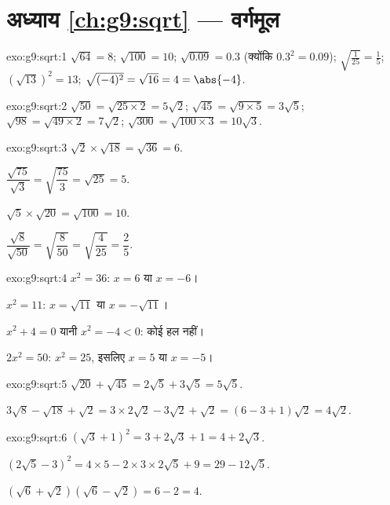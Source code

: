\section*{अध्याय \ref{ch:g9:sqrt} --- वर्गमूल}

\begin{solution}{exo:g9:sqrt:1}
$\sqrt{64} = 8$; \quad $\sqrt{100} = 10$; \quad
$\sqrt{0.09} = 0.3$ (क्योंकि $0.3^2 = 0.09$); \quad
$\sqrt{\frac{1}{25}} = \frac15$; \quad
$\left(\sqrt{13}\right)^2 = 13$; \quad
$\sqrt{(-4)^2} = \sqrt{16} = 4 = \abs{-4}$.
\end{solution}

\begin{solution}{exo:g9:sqrt:2}
$\sqrt{50} = \sqrt{25 \times 2} = 5\sqrt2$; \quad
$\sqrt{45} = \sqrt{9 \times 5} = 3\sqrt5$; \quad
$\sqrt{98} = \sqrt{49 \times 2} = 7\sqrt2$; \quad
$\sqrt{300} = \sqrt{100 \times 3} = 10\sqrt3$.
\end{solution}

\begin{solution}{exo:g9:sqrt:3}
$\sqrt2 \times \sqrt{18} = \sqrt{36} = 6$.

$\dfrac{\sqrt{75}}{\sqrt3} = \sqrt{\dfrac{75}{3}} = \sqrt{25} = 5$.

$\sqrt5 \times \sqrt{20} = \sqrt{100} = 10$.

$\dfrac{\sqrt8}{\sqrt{50}} = \sqrt{\dfrac{8}{50}} = \sqrt{\dfrac{4}{25}}
= \dfrac25$.
\end{solution}

\begin{solution}{exo:g9:sqrt:4}
$x^2 = 36$: $x = 6$ या $x = -6$।

$x^2 = 11$: $x = \sqrt{11}$ या $x = -\sqrt{11}$।

$x^2 + 4 = 0$ यानी $x^2 = -4 < 0$: कोई हल नहीं।

$2x^2 = 50$: $x^2 = 25$, इसलिए $x = 5$ या $x = -5$।
\end{solution}

\begin{solution}{exo:g9:sqrt:5}
$\sqrt{20} + \sqrt{45} = 2\sqrt5 + 3\sqrt5 = 5\sqrt5$.

$3\sqrt8 - \sqrt{18} + \sqrt2 = 3 \times 2\sqrt2 - 3\sqrt2 + \sqrt2
= (6 - 3 + 1)\sqrt2 = 4\sqrt2$.
\end{solution}

\begin{solution}{exo:g9:sqrt:6}
$\left(\sqrt3 + 1\right)^2 = 3 + 2\sqrt3 + 1 = 4 + 2\sqrt3$.

$\left(2\sqrt5 - 3\right)^2 = 4 \times 5 - 2 \times 3 \times 2\sqrt5 + 9
= 29 - 12\sqrt5$.

$\left(\sqrt6 + \sqrt2\right)\left(\sqrt6 - \sqrt2\right) = 6 - 2 = 4$.
\end{solution}

